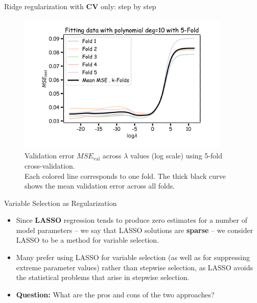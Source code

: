 \begin{frame}{Ridge regularization with \textbf{CV} only: step by step}
\begin{figure}
    \centering
    \includegraphics[width=0.9\textwidth]{images/linear-regression/linear-regression-34.png}
    \caption*{
        \small
        Validation error $MSE_{\text{val}}$ across $\lambda$ values (log scale) using 5-fold cross-validation. \\
        Each colored line corresponds to one fold. The thick black curve shows the mean validation error across all folds.
    }
\end{figure}
\end{frame}


\begin{frame}{Variable Selection as Regularization}

\begin{itemize}
    \item Since \textbf{LASSO} regression tends to produce zero estimates for a number of model parameters – we say that LASSO solutions are \textbf{sparse} – we consider LASSO to be a method for variable selection.
    
    \item Many prefer using LASSO for variable selection (as well as for suppressing extreme parameter values) rather than stepwise selection, as LASSO avoids the statistical problems that arise in stepwise selection.
    
    \item \textbf{Question:} What are the pros and cons of the two approaches?
\end{itemize}

\end{frame}
